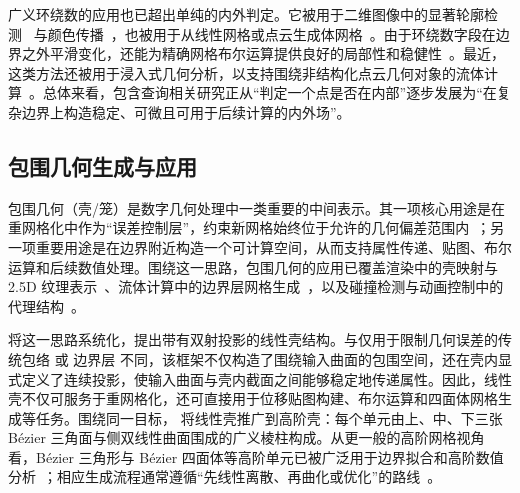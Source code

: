 广义环绕数的应用也已超出单纯的内外判定。它被用于二维图像中的显著轮廓检测~\cite{Ming2015WindingNC} 与颜色传播~\cite{Scrivener2024WindingNF}，也被用于从线性网格或点云生成体网格~\cite{Jacobson2013RobustIS,Barill2018}。由于环绕数字段在边界之外平滑变化，还能为精确网格布尔运算提供良好的局部性和稳健性~\cite{Trettner2022EMBER}。最近，这类方法还被用于浸入式几何分析，以支持围绕非结构化点云几何对象的流体计算~\cite{Balu2023}。总体来看，包含查询相关研究正从“判定一个点是否在内部”逐步发展为“在复杂边界上构造稳定、可微且可用于后续计算的内外场”。

\subsection{包围几何生成与应用}
包围几何（壳/笼）是数字几何处理中一类重要的中间表示。其一项核心用途是在重网格化中作为“误差控制层”，约束新网格始终位于允许的几何偏差范围内~\cite{hu2019TriWild,cheng2019practical,hu2020fast}；另一项重要用途是在边界附近构造一个可计算空间，从而支持属性传递、贴图、布尔运算和后续数值处理。围绕这一思路，包围几何的应用已覆盖渲染中的壳映射与 2.5D 纹理表示~\cite{chen2004shell,hormann2007mesh,jin2019shell,lengyel2001real,peng2004interactive,porumbescu2005shell,wang2003view,wang2004generalized}、流体计算中的边界层网格生成~\cite{aubry2017boundary,garimella2000boundary}，以及碰撞检测与动画控制中的代理结构~\cite{calderon2017bounding,thiery2012cager}。

\citet{Jiang2020BijectivePI} 将这一思路系统化，提出带有双射投影的线性壳结构。与仅用于限制几何误差的传统包络 或 边界层 不同，该框架不仅构造了围绕输入曲面的包围空间，还在壳内显式定义了连续投影，使输入曲面与壳内截面之间能够稳定地传递属性。因此，线性壳不仅可服务于重网格化，还可直接用于位移贴图构建、布尔运算和四面体网格生成等任务。围绕同一目标，\citet{liu2024curveshell} 将线性壳推广到高阶壳：每个单元由上、中、下三张 B\'{e}zier 三角面与侧双线性曲面围成的广义棱柱构成。从更一般的高阶网格视角看，B\'{e}zier 三角形与 B\'{e}zier 四面体等高阶单元已被广泛用于边界拟合和高阶数值分析~\cite{farin1986triangular,mandad2020bezier,Dey99curvilinearmesh,Ferguson2022HighOrderIP,Ruiz-Giron2021Measure}；相应生成流程通常遵循“先线性离散、再曲化或优化”的路线~\cite{LIU2021103080,Jiang2021Bijectiveandcoarse,Xu2014,Jiang2021BijectiveAC}。

